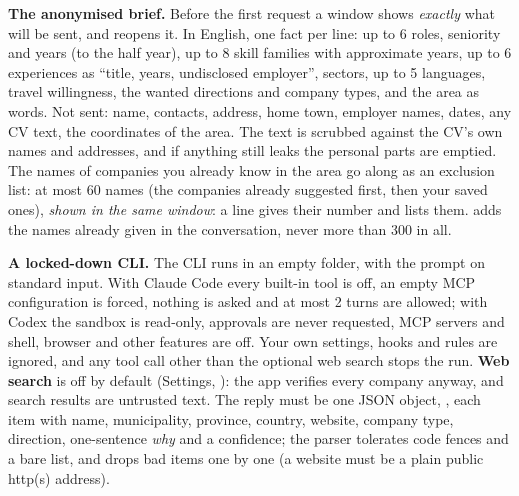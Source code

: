 \textbf{The anonymised brief.} Before the first request a window shows \emph{exactly} what will be sent, and
 reopens it. In English, one fact per line: up to 6 roles, seniority and years (to the half
year), up to 8 skill families with approximate years, up to 6 experiences as ``title, years, undisclosed
employer'', sectors, up to 5 languages, travel willingness, the wanted directions and company types, and the
area as words. Not sent: name, contacts, address, home town, employer names, dates, any CV text, the
coordinates of the area. The text is scrubbed against the CV's own names and addresses, and if anything still
leaks the personal parts are emptied. The names of companies you already know in the area go along as an exclusion list: at most 60 names (the
companies already suggested first, then your saved ones), \emph{shown in the same window}: a line gives their
number and  lists them.  adds the names already given in the conversation, never
more than 300 in all.

\textbf{A locked-down CLI.} The CLI runs in an empty folder, with the prompt on standard input. With Claude
Code every built-in tool is off, an empty MCP configuration is forced, nothing is asked and at most 2 turns
are allowed; with Codex the sandbox is read-only, approvals are never requested, MCP servers and shell, browser
and other features are off. Your own settings, hooks and rules are ignored, and any tool call other than the
optional web search stops the run. \textbf{Web search} is off by default (Settings, ):
the app verifies every company anyway, and search results are untrusted text. The reply must be one JSON
object, , each item with name, municipality,
province, country, website, company type, direction, one-sentence \emph{why} and a confidence;
the parser tolerates code fences and a bare list, and drops bad items one by one (a website must be a plain
public http(s) address).

